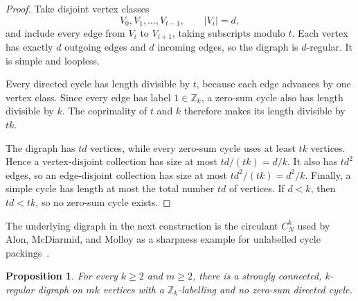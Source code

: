\documentclass[11pt]{amsart}
\newtheorem{proposition}[theorem]{Proposition}
\theoremstyle{remark}
\begin{document}
\begin{proof}
Take disjoint vertex classes
\[
  V_0,V_1,\ldots,V_{t-1},
  \qquad |V_i|=d,
\]
and include every edge from $V_i$ to $V_{i+1}$, taking subscripts
modulo $t$.  Each vertex has exactly $d$ outgoing edges and $d$ incoming
edges, so the digraph is $d$-regular.  It is simple and loopless.

Every directed cycle has length divisible by $t$, because each edge
advances by one vertex class.  Since every edge has label
$1\in\mathbb Z_k$, a zero-sum cycle also has length divisible by $k$.
The coprimality of $t$ and $k$ therefore makes its length divisible by
$tk$.

The digraph has $td$ vertices, while every zero-sum cycle uses at least
$tk$ vertices.  Hence a vertex-disjoint collection has size at most
$td/(tk)=d/k$.  It also has $td^2$ edges, so an edge-disjoint
collection has size at most $td^2/(tk)=d^2/k$.  Finally, a simple cycle
has length at most the total number $td$ of vertices.  If $d<k$, then
$td<tk$, so no zero-sum cycle exists.
\end{proof}

The underlying digraph in the next construction is the circulant
$C_N^k$ used by Alon, McDiarmid, and Molloy as a sharpness example for
unlabelled cycle packings~\cite[p.~232]{AlonMcDiarmidMolloy}.

\begin{proposition}
\label{prop:circulant-obstruction}
For every $k\ge2$ and $m\ge2$, there is a strongly connected,
$k$-regular digraph on $mk$ vertices with a $\mathbb Z_k$-labelling
and no zero-sum directed cycle.
\end{proposition}
\end{document}
